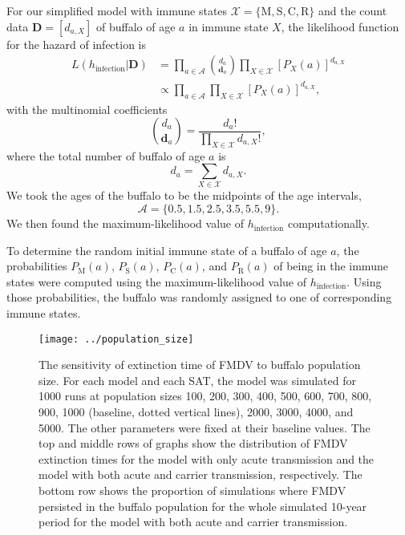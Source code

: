 \documentclass[12pt, UKenglish]{article}  %
\renewcommand{\vec}[1]{\mathbf{#1}}
\newcommand{\mat}[1]{\mathbf{#1}}
\begin{document}
For our simplified model with immune states $\mathcal{X} =
\{\mathrm{M}, \mathrm{S}, \mathrm{C}, \mathrm{R}\}$
and the count data
$\mat{D} = \left[d_{a, X}\right]$ of buffalo of age $a$ in immune
state $X$, the likelihood function for the hazard of infection is
\begin{equation}
  \begin{split}
    L\left(h_{\text{infection}} \big| \mat{D}\right)
    &= \prod_{a \in {\mathcal{A}}}
    \binom{d_a}{\vec{d}_a}
    \prod_{X \in \mathcal{X}}
    \left[P_X(a)\right]^{d_{a, X}}
    \\
    &\propto \prod_{a \in {\mathcal{A}}}
    \prod_{X \in \mathcal{X}}
    \left[P_X(a)\right]^{d_{a, X}},
  \end{split}
\end{equation}
with the multinomial coefficients
\begin{equation}
  \binom{d_a}{\vec{d}_a}
  = \frac{d_a!}{\prod\limits_{X \in \mathcal{X}} d_{a, X}!},
\end{equation}
where the total number of buffalo of age $a$ is
\begin{equation}
  d_a = \sum_{X \in \mathcal{X}} d_{a, X}.
\end{equation}
We took the ages of the buffalo to be the midpoints of the age
intervals,
\begin{equation}
  \mathcal{A} = \{0.5, 1.5, 2.5, 3.5, 5.5, 9\}.
\end{equation}
We then found the maximum-likelihood value of $h_{\text{infection}}$
computationally.

To determine the random initial immune state of a buffalo of age $a$,
the probabilities $P_{\mathrm{M}}(a)$, $P_{\mathrm{S}}(a)$,
$P_{\mathrm{C}}(a)$, and $P_{\mathrm{R}}(a)$ of being in the immune
states were computed using the maximum-likelihood value of
$h_{\text{infection}}$. Using those probabilities, the buffalo was
randomly assigned to one of corresponding immune states.


\printbibliography


\clearpage


\begin{figure}
  \centering
  \texttt{[image: ../population\_size]}
  \caption{The sensitivity of extinction time of FMDV to buffalo
    population size.
    For each model and each SAT, the model was simulated for 1000 runs
    at population sizes 100, 200, 300, 400, 500, 600, 700, 800, 900,
    1000 (baseline, dotted vertical lines), 2000, 3000, 4000, and
    5000.
    The other parameters were fixed at their baseline values.
    The top and middle rows of graphs show the distribution of
    FMDV extinction times for the model with only acute transmission
    and the model with both acute and carrier transmission,
    respectively.
    The bottom row shows the proportion of simulations where FMDV
    persisted in the buffalo population for the whole simulated
    10-year period for the model with both acute and carrier
    transmission.}
\end{figure}
\end{document}
